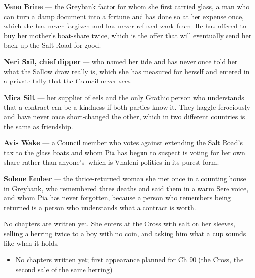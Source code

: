 \documentclass{design/chronicle}
\begin{document}
{\textbf{Veno Brine} — the Greybank factor for whom she first carried glass, a man who can turn a damp document into a fortune and has done so at her expense once, which she has never forgiven and has never refused work from. He has offered to buy her mother’s boat-share twice, which is the offer that will eventually send her back up the Salt Road for good.

\textbf{Neri Sail, chief dipper} — who named her tide and has never once told her what the Sallow draw really is, which she has measured for herself and entered in a private tally that the Council never sees.

\textbf{Mira Silt} — her supplier of eels and the only Grathic person who understands that a contract can be a kindness if both parties know it. They haggle ferociously and have never once short-changed the other, which in two different countries is the same as friendship.

\textbf{Avis Wake} — a Council member who votes against extending the Salt Road’s tax to the glass boats and whom Pia has begun to suspect is voting for her own share rather than anyone’s, which is Vhaleni politics in its purest form.

\textbf{Solene Ember} — the thrice-returned woman she met once in a counting house in Greybank, who remembered three deaths and said them in a warm Sere voice, and whom Pia has never forgotten, because a person who remembers being returned is a person who understands what a contract is worth.

No chapters are written yet. She enters at the Cross with salt on her sleeves, selling a herring twice to a boy with no coin, and asking him what a cup sounds like when it holds.

\begin{itemize}[leftmargin=1.4em,itemsep=1pt,topsep=3pt,parsep=0pt]

\item No chapters written yet; first appearance planned for Ch 90 (the Cross, the second sale of the same herring).

\end{itemize}
}
\end{document}

